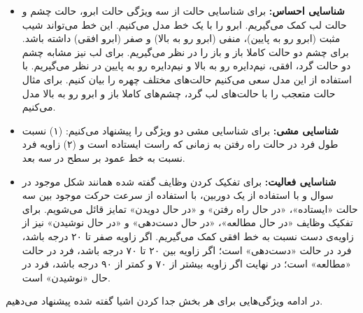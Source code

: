 \documentclass[14pt,a4]{article}
\begin{document}
\begin{itemize}
    \item \textbf{شناسایی احساس:} برای شناسایی حالت از سه ویژگی حالت ابرو، حالت چشم و حالت لب کمک می‌گیریم.
    ابرو را با یک خط مدل می‌کنیم. این خط می‌تواند شیب مثبت (ابرو رو به پایین)، منفی (ابرو رو به بالا)
    و صفر (ابرو افقی) داشته باشد. برای چشم دو حالت کاملا باز و باز را در نظر می‌گیریم. برای لب نیز مشابه
    چشم دو حالت گرد، افقی، نیم‌دایره رو به بالا و نیم‌دایره رو به پایین در نظر می‌گیریم.
    با استفاده از این مدل سعی می‌کنیم حالت‌های مختلف چهره را بیان کنیم. برای مثال حالت متعجب را
    با حالت‌های لب گرد، چشم‌های کاملا باز و ابرو رو به بالا مدل می‌کنیم.
    \item \textbf{شناسایی مشی:} برای شناسایی مشی دو ویژگی را
    پیشنهاد می‌کنیم: (۱) نسبت طول فرد در حالت راه رفتن به زمانی که راست ایستاده است و
    (۲) زاویه فرد نسبت به خط عمود بر سطح در سه بعد.
    \item \textbf{شناسایی فعالیت:} برای تفکیک کردن وظایف گفته شده
    همانند شکل موجود در سوال و با استفاده از یک دوربین، با استفاده از سرعت حرکت موجود بین سه حالت
    «ایستاده»، «در حال راه رفتن» و «در حال دویدن» تمایز قائل می‌شویم. برای تفکیک وظایف «در حال مطالعه»،
    «در حال دست‌دهی» و «در حال نوشیدن» نیز از زاویه‌ی دست نسبت به خط افقی کمک می‌گیریم. اگر زاویه
    صفر تا ۲۰ درجه باشد، فرد در حالت «دست‌دهی» است؛ اگر زاویه بین ۲۰ تا ۷۰ درجه باشد، فرد در حالت «مطالعه» است؛
    در نهایت اگر زاویه بیشتر از ۷۰ و کمتر از ۹۰ درجه باشد، فرد در حال «نوشیدن» است.
\end{itemize}

در ادامه ویژگی‌هایی برای هر بخش جدا کردن اشیا گفته شده پیشنهاد می‌دهیم.
\end{document}
